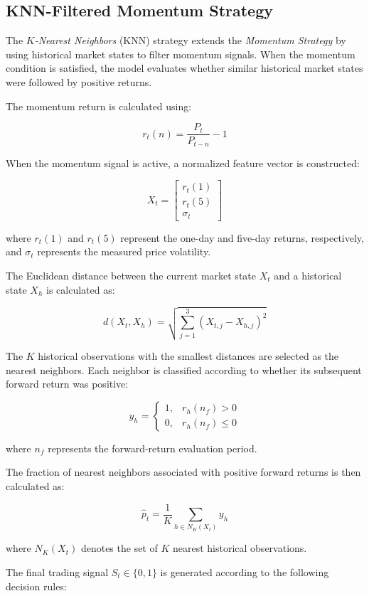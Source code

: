 \documentclass{article}
\begin{document}
\subsection{KNN-Filtered Momentum Strategy}

The \textit{$K$-Nearest Neighbors} (KNN) strategy extends the \textit{Momentum Strategy} by using historical market states to filter momentum signals. When the momentum condition is satisfied, the model evaluates whether similar historical market states were followed by positive returns.

The momentum return is calculated using:

\[
r_t(n) = \frac{P_t}{P_{t-n}} - 1
\]

When the momentum signal is active, a normalized feature vector is constructed:

\[
X_t =
\begin{bmatrix}
r_t(1) \\
r_t(5) \\
\sigma_t
\end{bmatrix}
\]

where $r_t(1)$ and $r_t(5)$ represent the one-day and five-day returns, respectively, and $\sigma_t$ represents the measured price volatility.

The Euclidean distance between the current market state $X_t$ and a historical state $X_h$ is calculated as:

\[
d(X_t,X_h)
=
\sqrt{
\sum_{j=1}^{3}
\left(
X_{t,j}-X_{h,j}
\right)^2
}
\]

The $K$ historical observations with the smallest distances are selected as the nearest neighbors. Each neighbor is classified according to whether its subsequent forward return was positive:

\[
y_h =
\begin{cases}
1, & r_h(n_f) > 0 \\
0, & r_h(n_f) \le 0
\end{cases}
\]

where $n_f$ represents the forward-return evaluation period.

The fraction of nearest neighbors associated with positive forward returns is then calculated as:

\[
\hat{p}_t =
\frac{1}{K}
\sum_{h \in N_K(X_t)} y_h
\]

where $N_K(X_t)$ denotes the set of $K$ nearest historical observations.

The final trading signal $S_t \in \{0,1\}$ is generated according to the following decision rules:
\end{document}
